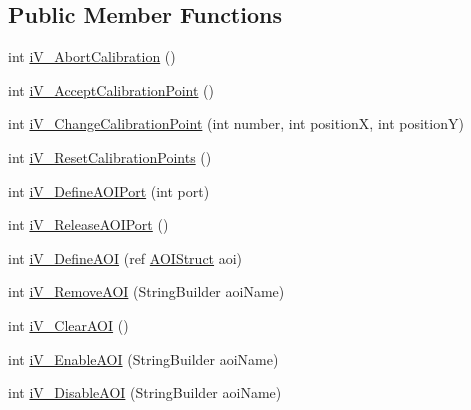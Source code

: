 \subsection*{Public Member Functions}
\begin{DoxyCompactItemize}
\item 
int \hyperlink{class_web_analyzer_1_1_eye_tracking_1_1_eye_tracking_controller_afe1ed106a76e89624985ce65488f5406}{i\+V\+\_\+\+Abort\+Calibration} ()
\item 
int \hyperlink{class_web_analyzer_1_1_eye_tracking_1_1_eye_tracking_controller_a16aa32e9c39e0a25ed42861ad9b100bd}{i\+V\+\_\+\+Accept\+Calibration\+Point} ()
\item 
int \hyperlink{class_web_analyzer_1_1_eye_tracking_1_1_eye_tracking_controller_a43f17db60a0e4b65092880d9452199f8}{i\+V\+\_\+\+Change\+Calibration\+Point} (int number, int position\+X, int position\+Y)
\item 
int \hyperlink{class_web_analyzer_1_1_eye_tracking_1_1_eye_tracking_controller_afbed91aa5c16edbd1e5d436d5abc0883}{i\+V\+\_\+\+Reset\+Calibration\+Points} ()
\item 
int \hyperlink{class_web_analyzer_1_1_eye_tracking_1_1_eye_tracking_controller_aaf9a3e8173c45caca4767719ddf34a10}{i\+V\+\_\+\+Define\+A\+O\+I\+Port} (int port)
\item 
int \hyperlink{class_web_analyzer_1_1_eye_tracking_1_1_eye_tracking_controller_aaa4a2abd70c3da08fd08ba59d84c5216}{i\+V\+\_\+\+Release\+A\+O\+I\+Port} ()
\item 
int \hyperlink{class_web_analyzer_1_1_eye_tracking_1_1_eye_tracking_controller_a87576506f1f0bca2d1d2f77bd0c59c30}{i\+V\+\_\+\+Define\+A\+O\+I} (ref \hyperlink{struct_web_analyzer_1_1_eye_tracking_1_1_eye_tracking_controller_1_1_a_o_i_struct}{A\+O\+I\+Struct} aoi)
\item 
int \hyperlink{class_web_analyzer_1_1_eye_tracking_1_1_eye_tracking_controller_a373f71e6004445ea0caaeb20bba4eba4}{i\+V\+\_\+\+Remove\+A\+O\+I} (String\+Builder aoi\+Name)
\item 
int \hyperlink{class_web_analyzer_1_1_eye_tracking_1_1_eye_tracking_controller_af5b3d871257fa54cd55db04e80839592}{i\+V\+\_\+\+Clear\+A\+O\+I} ()
\item 
int \hyperlink{class_web_analyzer_1_1_eye_tracking_1_1_eye_tracking_controller_a79b457d90723744da8c4ad544b9ef3cd}{i\+V\+\_\+\+Enable\+A\+O\+I} (String\+Builder aoi\+Name)
\item 
int \hyperlink{class_web_analyzer_1_1_eye_tracking_1_1_eye_tracking_controller_a7f2b1e404b390b353f7325e61b1af42b}{i\+V\+\_\+\+Disable\+A\+O\+I} (String\+Builder aoi\+Name)

\end{DoxyCompactItemize}
